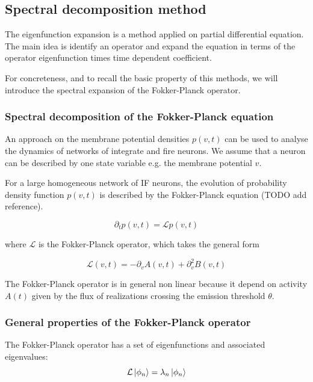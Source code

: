 \documentclass[a4paper,11pt,twoside]{article}
\numberwithin{equation}{section}
\begin{document}
\subsection{Spectral decomposition method}

The  eigenfunction expansion is a method applied on partial differential equation. The main idea is identify an operator and expand the equation in terms of the operator eigenfunction times time dependent coefficient. 


For concreteness, and to recall the basic property of this methods, we will introduce the spectral expansion of the Fokker-Planck operator.


\subsubsection{Spectral decomposition of the Fokker-Planck equation}
An approach on the membrane potential densities $p(v,t)$ can be used to analyse the dynamics of networks of integrate and fire neurons. We assume that a neuron can be described by one state variable e.g. the membrane potential $v$.

For a large homogeneous network of IF neurons, the evolution of probability density function $p(v,t)$ is described by the Fokker-Planck equation (TODO add reference).  

\begin{equation}
\label{eq:fokkerplanck}
\partial_t p(v,t)=\mathcal{L}p(v,t)
\end{equation}

where $\mathcal{L}$ is the Fokker-Planck operator, which takes the general form

\begin{equation}
\label{eq:Lfokker}
\mathcal{L}(v,t)=-\partial_v A(v,t) +\partial_v^2 B(v,t)
\end{equation}

The Fokker-Planck operator is in general non linear because it depend on activity $A(t)$ given by the flux of realizations crossing the emission threshold $\theta$.


\subsubsection{General properties of the Fokker-Planck operator}
The Fokker-Planck operator has a set of eigenfunctions and associated eigenvalues:
\begin{equation}
\label{eq:fokkerplanckoperator}
\mathcal{L}\ket{\phi_n}=\lambda_n\ket{\phi_n}
\end{equation}
\end{document}
